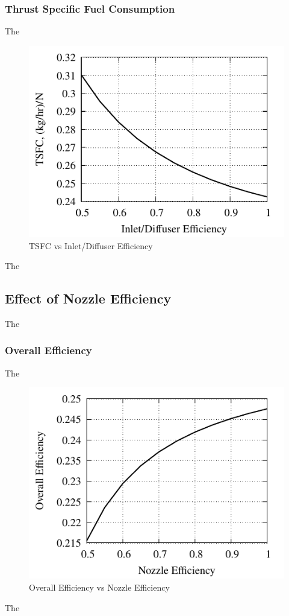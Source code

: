 \documentclass[conf]{new-aiaa} %
\begin{document}
\subsubsection{Thrust Specific Fuel Consumption}
The

\begin{figure}[hbt!] %
    \centering
    \includegraphics[]{media/performance_parameter_files/part_f_TSFC.pdf}
    \caption{\label{fig:partftsfc}TSFC vs Inlet/Diffuser Efficiency}
\end{figure}
The

\subsection{Effect of Nozzle Efficiency} %
The

\subsubsection{Overall Efficiency}
The

\begin{figure}[hbt!] %
    \centering
    \includegraphics[]{media/performance_parameter_files/part_g_eta_o.pdf}
    \caption{\label{fig:partgetao}Overall Efficiency vs Nozzle Efficiency}
\end{figure}
The
\end{document}
